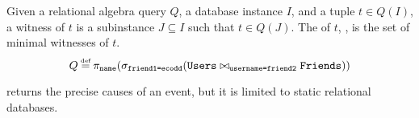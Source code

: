 Given a relational algebra query $Q$, a database instance $I$, and a tuple $t
\in Q(I)$, a witness of $t$ is a subinstance $J \subseteq I$ such that $t \in
Q(J)$. The \whyprovenance{} of $t$, , is the set of minimal
witnesses of $t$.
%
\[
  Q \defeq \pi_{\texttt{name}}(
    \sigma_{\texttt{friend1=ecodd}}(
      \texttt{Users} \join_{\texttt{username=friend2}} \texttt{Friends}
    )
  )
\]
%


\Whyprovenance{} returns the precise causes of an event, but it is limited to
static relational databases.
